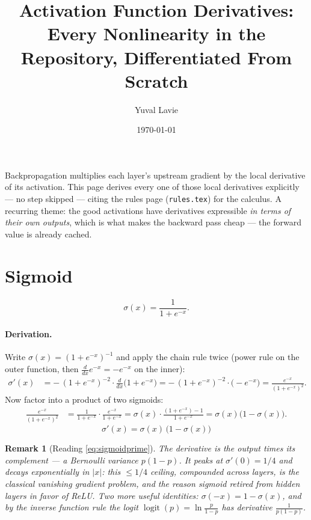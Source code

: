 \documentclass[11pt]{article}
\title{Activation Function Derivatives:\\
Every Nonlinearity in the Repository, Differentiated From Scratch}
\author{Yuval Lavie}
\date{\today}
\newtheorem{remark}{Remark}
\begin{document}
\maketitle

\noindent
Backpropagation multiplies each layer's upstream gradient by the local
derivative of its activation. This page derives every one of those
local derivatives explicitly --- no step skipped --- citing the rules
page (\texttt{rules.tex}) for the calculus. A recurring theme:
the good activations have derivatives expressible \emph{in terms of
their own outputs}, which is what makes the backward pass cheap ---
the forward value is already cached.

\section{Sigmoid}

\begin{equation}
  \sigma(x) = \frac{1}{1 + e^{-x}}.
  \label{eq:sigmoid}
\end{equation}

\paragraph{Derivation.} Write $\sigma(x) = (1 + e^{-x})^{-1}$ and apply
the chain rule twice (power rule on the outer function, then
$\frac{d}{dx}e^{-x} = -e^{-x}$ on the inner):
\begin{align*}
  \sigma'(x)
  &= -\,(1 + e^{-x})^{-2} \cdot \frac{d}{dx}\bigl(1 + e^{-x}\bigr)
   = -\,(1 + e^{-x})^{-2} \cdot \bigl(-e^{-x}\bigr)
   = \frac{e^{-x}}{(1 + e^{-x})^{2}}.
\end{align*}
Now factor into a product of two sigmoids:
\begin{align*}
  \frac{e^{-x}}{(1+e^{-x})^{2}}
  &= \frac{1}{1+e^{-x}} \cdot \frac{e^{-x}}{1+e^{-x}}
   = \sigma(x)\cdot\frac{(1 + e^{-x}) - 1}{1+e^{-x}}
   = \sigma(x)\bigl(1 - \sigma(x)\bigr).
\end{align*}
\begin{equation}
  \boxed{\;\sigma'(x) = \sigma(x)\,\bigl(1 - \sigma(x)\bigr)\;}
  \label{eq:sigmoidprime}
\end{equation}

\begin{remark}[Reading \eqref{eq:sigmoidprime}]
The derivative is the output times its complement --- a Bernoulli
variance $p(1-p)$. It peaks at $\sigma'(0) = 1/4$ and decays
exponentially in $|x|$: this $\le 1/4$ ceiling, compounded across
layers, is the classical \emph{vanishing gradient} problem, and the
reason sigmoid retired from hidden layers in favor of ReLU.
Two more useful identities: $\sigma(-x) = 1 - \sigma(x)$, and by the
inverse function rule the logit
$\operatorname{logit}(p) = \ln\frac{p}{1-p}$ has derivative
$\frac{1}{p(1-p)}$.
\end{remark}
\end{document}
